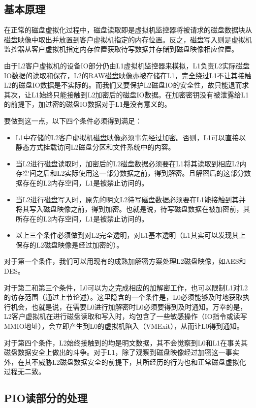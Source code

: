 \subsection{基本原理}

在正常的磁盘虚拟化过程中，磁盘读取即是虚拟机监控器将被请求的磁盘数据块从磁盘映像中取出并放置到客户虚拟机指定的内存位置。反之，磁盘写入则是虚拟机监控器从客户虚拟机指定内存位置获取待写数据并存储到磁盘映像相应位置。

由于L2客户虚拟机的设备IO部分仍由L1虚拟机监控器来模拟，L1负责L2实际磁盘IO数据的读取和保存，L2的RAW磁盘映像亦被存储在L1，完全绕过L1不让其接触L2的磁盘IO数据是不实际的。而我们又要保护L2磁盘IO的安全性，故只能退而求其次，让L1始终只能接触到L2加密后的磁盘IO数据。在加密密钥没有被泄露给L1的前提下，加过密的磁盘IO数据对于L1是没有意义的。

要做到这一点，以下四个条件必须得到满足：

\begin{itemize}
\item{L1中存储的L2客户虚拟机磁盘映像必须事先经过加密。否则，L1可以直接以静态方式挂载访问L2磁盘分区和文件系统中的内容。}
\item{当L2进行磁盘读取时，加密后的L2磁盘数据必须要在L1将其读取到相应L2内存空间之后和L2实际使用这一部分数据之前，得到解密。且解密后的这部分数据存在的L2内存空间，L1是被禁止访问的。}
\item{当L2进行磁盘写入时，原先的明文L2待写磁盘数据必须要在L1能接触到其并将其写入磁盘映像之前，得到加密。也就是说，待写磁盘数据在被加密前，其所存在的L2内存空间，L1是被禁止访问的。}
\item{以上三个条件必须做到对L2完全透明，对L1基本透明（L1其实可以发现其上保存的L2磁盘映像是经过加密的）。}
\end{itemize}

对于第一个条件，我们可以用现有的成熟加解密方案处理L2磁盘映像，如AES和DES。

对于第二和第三个条件，L0可以为之完成相应的加解密工作，也可以限制L1对L2的访存范围（通过上节论述）。这里隐含的一个条件是，L0必须能够及时地获取执行机会，也就是说，在需要L0进行加解密时L0必须要得到及时通知。万幸的是，L2客户虚拟机在进行磁盘读取和写入时，均包含了一些敏感操作（IO指令或读写MMIO地址），会立即产生到L0的虚拟机陷入（VMExit），从而让L0得到通知。

对于第四个条件，L2始终接触到的均是明文数据，其不会觉察到L0和L1在事关其磁盘数据安全上做出的斗争。对于L1，除了观察到磁盘映像经过加密这一事实外，在其不威胁L2磁盘数据安全的前提下，其所经历的行为也和正常磁盘虚拟化过程无二致。


\subsection{PIO读部分的处理}

